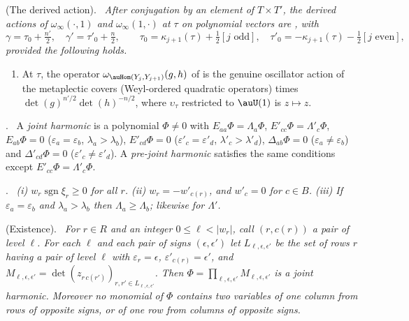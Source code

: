 \documentclass[10pt]{amsart}
\theoremstyle{definition}
\theoremstyle{remark}
\providecommand{\parsgn}{\operatorname{sgn}}
\newenvironment{quotedthm}[2]{\par\medskip\noindent\begingroup
  \textbf{#1}#2.\ \itshape\ignorespaces}{\endgroup\par\medskip}
\newenvironment{quoteddef}[2]{\par\medskip\noindent\begingroup
  \textbf{#1}#2.\ \ignorespaces}{\endgroup\par\medskip}
\begin{document}
\begin{quotedthm}{\cite[Lemma~3.6]{P49}}{ (The derived action)}
After conjugation by an element of $T\times T'$, the derived actions of $\omega_\infty(\cdot,1)$ and
$\omega_\infty(1,\cdot)$ at $\tau$ on polynomial vectors are {\cite[(12)]{P49}}, with
\[
\gamma=\tau_0+\tfrac{n'}2,\quad\gamma'=\tau'_0+\tfrac n2,\qquad
\tau_0=\kappa_{j+1}(\tau)+\tfrac12[j\text{ odd}],\quad\tau'_0=-\kappa_{j+1}(\tau)-\tfrac12[j\text{ even}],
\]
provided the following holds.
\begin{enumerate}
\item[(V)] At $\tau$, the operator $\omega_{\auHom(Y_j,Y_{j+1})}(g,h)$ of {\cite[\S5.1.1]{P49}} is the
genuine oscillator action of the metaplectic covers (Weyl-ordered quadratic operators) times
$\det(g)^{n'/2}\det(h)^{-n/2}$, where $\upsilon_\tau$ restricted to $\auU(1)$ is $z\mapsto z$.
\end{enumerate}
\end{quotedthm}

\begin{quoteddef}{\cite[Definition~3.9]{P49}}{}
A \emph{joint harmonic} is a polynomial $\Phi\ne0$ with $E_{aa}\Phi=\Lambda_a\Phi$,
$E'_{cc}\Phi=\Lambda'_c\Phi$, $E_{ab}\Phi=0$ ($\varepsilon_a=\varepsilon_b$, $\lambda_a>\lambda_b$),
$E'_{cd}\Phi=0$ ($\varepsilon'_c=\varepsilon'_d$, $\lambda'_c>\lambda'_d$), $\Delta_{ab}\Phi=0$
($\varepsilon_a\ne\varepsilon_b$) and $\Delta'_{cd}\Phi=0$ ($\varepsilon'_c\ne\varepsilon'_d$). A
\emph{pre-joint harmonic} satisfies the same conditions except $E'_{cc}\Phi=\Lambda'_c\Phi$.
\end{quoteddef}

\begin{quotedthm}{\cite[Lemma~3.10]{P49}}{}
\textup{(i)} $w_r\parsgn\xi_r\ge0$ for all $r$. \textup{(ii)} $w_r=-w'_{c(r)}$, and $w'_c=0$ for $c\in B$.
\textup{(iii)} If $\varepsilon_a=\varepsilon_b$ and $\lambda_a>\lambda_b$ then $\Lambda_a\ge\Lambda_b$;
likewise for $\Lambda'$.
\end{quotedthm}

\begin{quotedthm}{\cite[Proposition~3.11]{P49}}{ (Existence)}
For $r\in R$ and an integer $0\le\ell<|w_r|$, call $(r,c(r))$ a pair of \emph{level} $\ell$. For each
$\ell$ and each pair of signs $(\epsilon,\epsilon')$ let $L_{\ell,\epsilon,\epsilon'}$ be the set of
rows $r$ having a pair of level $\ell$ with $\varepsilon_r=\epsilon$, $\varepsilon'_{c(r)}=\epsilon'$, and
$M_{\ell,\epsilon,\epsilon'}=\det(z_{r\,c(r')})_{r,r'\in L_{\ell,\epsilon,\epsilon'}}$. Then
$\Phi=\prod_{\ell,\epsilon,\epsilon'}M_{\ell,\epsilon,\epsilon'}$ is a joint harmonic. Moreover no monomial
of $\Phi$ contains two variables of one column from rows of opposite signs, or of one row from columns
of opposite signs.
\end{quotedthm}
\end{document}
